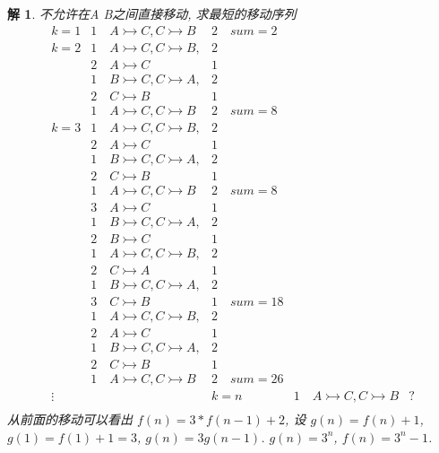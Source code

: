 \documentclass[mode=geye]{elegantnote}
\newtheorem{answer}{解}
\begin{document}
	\begin{answer}
		不允许在A B之间直接移动, 求最短的移动序列
		\begin{align*}
			k=1     & 1\quad A \rightarrowtail C, C \rightarrowtail B   & 2 \quad sum=2\\
			k=2     & 1\quad A \rightarrowtail C, C \rightarrowtail B,  & 2	\\
					& 2\quad A \rightarrowtail C                 		& 1	\\
				 	& 1\quad B \rightarrowtail C, C \rightarrowtail A,  & 2	\\
				 	& 2\quad C \rightarrowtail B						& 1	\\
				 	& 1\quad A \rightarrowtail C, C \rightarrowtail B   & 2 \quad sum=8 \\
			k=3     & 1\quad A \rightarrowtail C, C \rightarrowtail B,  & 2	\\
					& 2\quad A \rightarrowtail C                 		& 1	\\
					& 1\quad B \rightarrowtail C, C \rightarrowtail A,  & 2	\\
					& 2\quad C \rightarrowtail B						& 1	\\
					& 1\quad A \rightarrowtail C, C \rightarrowtail B   & 2 \quad sum=8\\
					& 3\quad A \rightarrowtail C                 		& 1	\\
					& 1\quad B \rightarrowtail C, C \rightarrowtail A,  & 2	\\
					& 2\quad B \rightarrowtail C						& 1	\\
					& 1\quad A \rightarrowtail C, C \rightarrowtail B,  & 2	\\
					& 2\quad C \rightarrowtail A						& 1	\\
					& 1\quad B \rightarrowtail C, C \rightarrowtail A,  & 2	\\
					& 3\quad C \rightarrowtail B						& 1	\quad sum=18\\
					& 1\quad A \rightarrowtail C, C \rightarrowtail B,  & 2	\\
					& 2\quad A \rightarrowtail C                 		& 1	\\
					& 1\quad B \rightarrowtail C, C \rightarrowtail A,  & 2	\\
					& 2\quad C \rightarrowtail B						& 1	\\
					& 1\quad A \rightarrowtail C, C \rightarrowtail B   & 2 \quad sum=26\\
			\vdots  &													&
			k=n     & 1\quad A \rightarrowtail C, C \rightarrowtail B	& ?\\
		\end{align*}
		从前面的移动可以看出 $ f(n) = 3*f(n-1)+2 $, 设 $ g(n) = f(n)+1 $, $ g(1)=f(1)+1 = 3 $, $ g(n) = 3g(n-1) $. $ g(n) = 3^{n} $, $ f(n) = 3^{n}-1 $.
	\end{answer}
	
\end{document}
